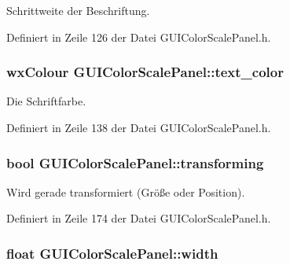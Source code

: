 Schrittweite der Beschriftung. 



Definiert in Zeile 126 der Datei G\-U\-I\-Color\-Scale\-Panel.\-h.

\hypertarget{classGUIColorScalePanel_a48e282e7a3bfff30894e9e6edfd120dc}{
\subsubsection[{text\-\_\-color}]{\setlength{\rightskip}{0pt plus 5cm}wx\-Colour G\-U\-I\-Color\-Scale\-Panel\-::text\-\_\-color\hspace{0.3cm}{\ttfamily [private]}}}\label{classGUIColorScalePanel_a48e282e7a3bfff30894e9e6edfd120dc}


Die Schriftfarbe. 



Definiert in Zeile 138 der Datei G\-U\-I\-Color\-Scale\-Panel.\-h.

\hypertarget{classGUIColorScalePanel_a3330450ed906fb99f56ed825d53f69e1}{
\subsubsection[{transforming}]{\setlength{\rightskip}{0pt plus 5cm}bool G\-U\-I\-Color\-Scale\-Panel\-::transforming\hspace{0.3cm}{\ttfamily [private]}}}\label{classGUIColorScalePanel_a3330450ed906fb99f56ed825d53f69e1}


Wird gerade transformiert (Größe oder Position). 



Definiert in Zeile 174 der Datei G\-U\-I\-Color\-Scale\-Panel.\-h.

\hypertarget{classGUIColorScalePanel_a1bc7bdf89d2447cddd08f5ae5f6638fa}{
\subsubsection[{width}]{\setlength{\rightskip}{0pt plus 5cm}float G\-U\-I\-Color\-Scale\-Panel\-::width\hspace{0.3cm}{\ttfamily [private]}}}\label{classGUIColorScalePanel_a1bc7bdf89d2447cddd08f5ae5f6638fa}



